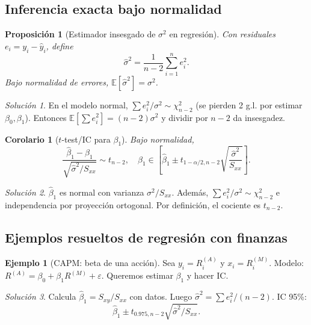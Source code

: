 \documentclass[11pt]{article}
\theoremstyle{plain}
\newtheorem{proposition}[theorem]{Proposición}
\newtheorem{corollary}[theorem]{Corolario}
\theoremstyle{definition}
\newtheorem{example}[theorem]{Ejemplo}
\theoremstyle{remark}
\theoremstyle{solstyle}
\newtheorem*{solution}{Solución}
\newcommand{\E}{\mathbb{E}}
\newcommand{\1}{\mathbbm{1}}
\begin{document}
\subsection{Inferencia exacta bajo normalidad}

\begin{proposition}[Estimador insesgado de $\sigma^2$ en regresión]
Con residuales $e_i=y_i-\widehat y_i$, define
\[
\widehat\sigma^2=\frac{1}{n-2}\sum_{i=1}^n e_i^2.
\]
Bajo normalidad de errores, $\E[\widehat\sigma^2]=\sigma^2$.
\end{proposition}

\begin{solution}
En el modelo normal, $\sum e_i^2/\sigma^2\sim\chi^2_{n-2}$ (se pierden 2 g.l. por estimar $\beta_0,\beta_1$).
Entonces $\E[\sum e_i^2]=(n-2)\sigma^2$ y dividir por $n-2$ da insesgadez.
\end{solution}

\begin{corollary}[$t$-test/IC para $\beta_1$]
Bajo normalidad,
\[
\frac{\widehat\beta_1-\beta_1}{\sqrt{\widehat\sigma^2/S_{xx}}}\sim t_{n-2},
\quad
\beta_1\in\left[\widehat\beta_1 \pm t_{1-\alpha/2,n-2}\sqrt{\frac{\widehat\sigma^2}{S_{xx}}}\right].
\]
\end{corollary}

\begin{solution}
$\widehat\beta_1$ es normal con varianza $\sigma^2/S_{xx}$.
Además, $\sum e_i^2/\sigma^2\sim\chi^2_{n-2}$ e independencia por proyección ortogonal.
Por definición, el cociente es $t_{n-2}$.
\end{solution}

\subsection{Ejemplos resueltos de regresión con finanzas}

\begin{example}[CAPM: beta de una acción]\label{ex:capm}
Sea $y_i=R_i^{(A)}$ y $x_i=R_i^{(M)}$.
Modelo: $R^{(A)}=\beta_0+\beta_1 R^{(M)}+\varepsilon$.
Queremos estimar $\beta_1$ y hacer IC.
\end{example}

\begin{solution}
Calcula $\widehat\beta_1=S_{xy}/S_{xx}$ con datos.
Luego $\widehat\sigma^2=\sum e_i^2/(n-2)$.
IC 95\%:
\[
\widehat\beta_1 \pm t_{0.975,n-2}\sqrt{\widehat\sigma^2/S_{xx}}.
\]
\end{solution}
\end{document}
